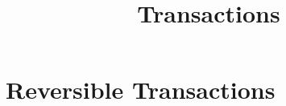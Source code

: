 \documentclass[../../OAE-SPEC-MAIN.tex]{subfiles}
\title{Transactions}
\begin{document}
\chapter{Reversible Transactions}\label{sec:reversible-transactions}



\clearpage




\end{document}

